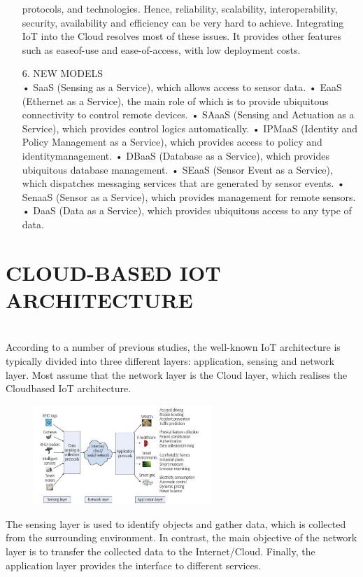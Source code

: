 \documentclass[11pt]{article}
\begin{document}
\begin{itemize}
protocols, and technologies. Hence, reliability, scalability,
interoperability, security, availability and efficiency can be
very hard to achieve. Integrating IoT into the Cloud resolves
most of these issues. It provides other features such as easeof-use and ease-of-access, with low deployment costs. 
\item[6.] NEW MODELS\\
• SaaS (Sensing as a Service), which allows access
to sensor data.
• EaaS (Ethernet as a Service), the main role of
which is to provide ubiquitous connectivity to control
remote devices.
• SAaaS (Sensing and Actuation as a Service),
which provides control logics automatically.
• IPMaaS (Identity and Policy Management as a Service), which provides access to policy and identitymanagement.
• DBaaS (Database as a Service), which provides
ubiquitous database management.
• SEaaS (Sensor Event as a Service), which
dispatches messaging services that are generated by
sensor events.
• SenaaS (Sensor as a Service), which provides
management for remote sensors.
• DaaS (Data as a Service), which provides
ubiquitous access to any type of data.
\end{itemize}
\section{CLOUD-BASED IOT ARCHITECTURE}\\
According to a number of previous studies, the well-known
IoT architecture is typically divided into three different layers: application, sensing and network layer. Most assume that the network layer is the Cloud layer, which realises the Cloudbased IoT architecture.
  \begin{figure}[h]
  \centering
  \includegraphics[width=0.6\textwidth]{fig/Screenshot (905).png}
  \end{figure}
The sensing layer is used to identify objects and gather
data, which is collected from the surrounding environment. In
contrast, the main objective of the network layer is to transfer the collected data to the Internet/Cloud. Finally, the application layer provides the interface to different services. 
\end{document}
